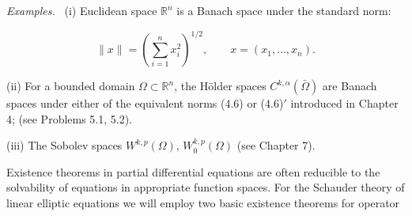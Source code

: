 \textit{Examples.} \ (i) Euclidean space $\mathbb R^n$ is a Banach space under the standard norm:

\[
\|x\|=\left(\sum_{i=1}^n x_i^2\right)^{1/2},\qquad x=(x_1,\ldots,x_n).
\]

(ii) For a bounded domain $\Omega\subset \mathbb R^n$, the H\"older spaces $C^{k,\alpha}(\bar\Omega)$ are Banach
spaces under either of the equivalent norms (4.6) or (4.6)$'$ introduced in Chapter 4;
(see Problems 5.1, 5.2).

(iii) The Sobolev spaces $W^{k,p}(\Omega)$, $W_0^{k,p}(\Omega)$ (see Chapter 7).

Existence theorems in partial differential equations are often reducible to the
solvability of equations in appropriate function spaces. For the Schauder theory of
linear elliptic equations we will employ two basic existence theorems for operator
